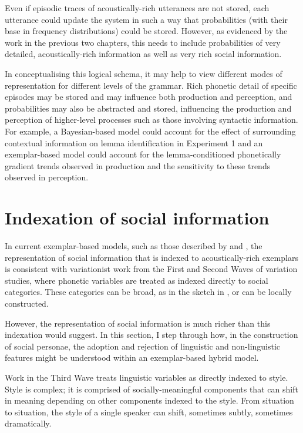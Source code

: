 \noindent Even if episodic traces of acoustically-rich utterances are not stored, each utte\-rance could update the system in such a way that probabilities (with their base in frequency distributions) could be stored.  However, as evidenced by the work in the previous two chapters, this needs to include probabilities of very detailed, acoustically-rich information as well as very rich social information.

	
In conceptualising this logical schema, it may help to view different modes of representation for different levels of the grammar.  Rich phonetic detail of specific episodes may be stored and may influence both production and perception, and probabilities may also be abstracted and stored, influencing the production and perception of higher-level processes such as those involving syntactic information.  For example, a Bayesian-based model could account for the effect of surrounding contextual information on lemma identification in Experiment 1 and an exemplar-based model could account for the lemma-conditioned phone\-tically gradient trends observed in production and the sensitivity to these trends observed in perception. 


\section{Indexation of social information}\label{sec:richmodel}

In current exemplar-based models, such as those described by \citet{johnson1997} and \citet{haywarrendrager2010}, the representation of social information that is indexed to acoustically-rich exemplars is consistent with variationist work from the First and Second Waves of variation studies, where phonetic variables are treated as indexed directly to social categories. These categories can be broad, as in the sketch in , or can be locally constructed.  

However, the representation of social information is much richer than this indexation would suggest.  In this section, I step through how, in the construction of social personae, the adoption and rejection of linguistic and non-linguistic features might be understood within an exemplar-based hybrid model.

Work in the Third Wave treats linguistic variables as directly indexed to style.  Style is complex; it is comprised of socially-meaningful components that can shift in meaning depending on other components indexed to the style.  From situation to situation, the style of a single speaker can shift, sometimes subtly, sometimes dramatically.  

